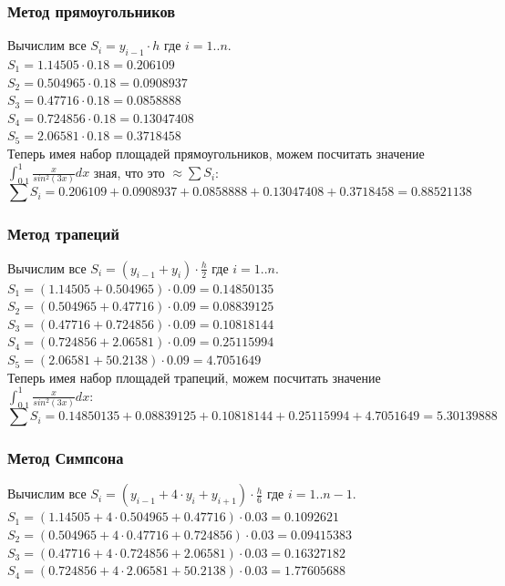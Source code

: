 \documentclass{article}
\begin{document}
\subsubsection{Метод прямоугольников}
Вычислим все $S_{i} = y_{i-1} \cdot h$ где $i = 1..n$. \\
$S_{1} =  1.14505 \cdot 0.18 = 0.206109$ \\
$S_{2} =  0.504965 \cdot 0.18 = 0.0908937$ \\
$S_{3} =  0.47716 \cdot 0.18 = 0.0858888$ \\
$S_{4} =  0.724856 \cdot 0.18 = 0.13047408$\\
$S_{5} =  2.06581 \cdot 0.18 = 0.3718458$\\

Теперь имея набор площадей прямоугольников, можем посчитать значение 
$\int_{0.1}^1 \frac{x}{sin^2(3x)}dx$ зная, что это  $\approx \sum S_{i}$: \\
\begin{displaymath} 
  \sum S_{i} = 0.206109 + 0.0908937 + 0.0858888 + 0.13047408 + 0.3718458 =
  0.88521138
\end{displaymath}

\subsubsection{Метод трапеций}
Вычислим все $S_{i} = (y_{i-1} + y_{i}) \cdot \frac{h}{2}$ где $i = 1..n$. \\
$S_{1} = (1.14505 + 0.504965 ) \cdot 0.09 = 0.14850135$\\
$S_{2} = (0.504965 + 0.47716 ) \cdot 0.09 = 0.08839125$\\
$S_{3} = (0.47716 + 0.724856 ) \cdot 0.09 = 0.10818144$\\
$S_{4} = (0.724856 + 2.06581 ) \cdot 0.09 = 0.25115994$\\
$S_{5} = (2.06581 +  50.2138 )  \cdot 0.09 = 4.7051649$\\

Теперь имея набор площадей трапеций, можем посчитать значение  
$\int_{0.1}^1 \frac{x}{sin^2(3x)}dx$:\\
\begin{displaymath} 
  \sum S_{i} = 0.14850135 + 0.08839125 + 0.10818144 + 0.25115994 + 4.7051649 =
  5.30139888
\end{displaymath}

\subsubsection{Метод Симпсона}
Вычислим все $S_{i} = (y_{i-1} + 4 \cdot y_{i} + y_{i+1}) \cdot \frac{h}{6}$ где
$i = 1..n-1$. \\
$S_{1} = (1.14505 + 4 \cdot 0.504965 + 0.47716) \cdot 0.03 = 0.1092621$\\
$S_{2} = (0.504965 + 4 \cdot 0.47716 + 0.724856) \cdot 0.03 = 0.09415383$\\
$S_{3} = (0.47716 + 4 \cdot 0.724856 + 2.06581) \cdot 0.03 = 0.16327182$\\
$S_{4} = (0.724856 + 4 \cdot 2.06581 + 50.2138) \cdot 0.03 = 1.77605688$\\
\end{document}

